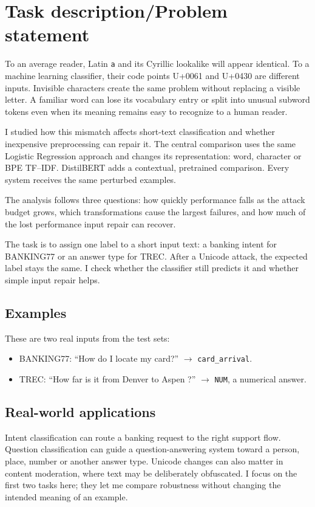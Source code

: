 \section{Task description/Problem statement}

To an average reader, Latin \texttt{a} and its Cyrillic lookalike will appear identical. To a machine learning classifier, their code points U+0061 and U+0430 are different inputs. Invisible characters create the same problem without replacing a visible letter. A familiar word can lose its vocabulary entry or split into unusual subword tokens even when its meaning remains easy to recognize to a human reader.

I studied how this mismatch affects short-text classification and whether inexpensive preprocessing can repair it. The central comparison uses the same Logistic Regression approach and changes its representation: word, character or BPE TF--IDF. DistilBERT adds a contextual, pretrained comparison. Every system receives the same perturbed examples.




The analysis follows three questions: how quickly performance falls as the attack budget grows, which transformations cause the largest failures, and how much of the lost performance input repair can recover.

The task is to assign one label to a short input text: a banking intent for BANKING77 or an answer type for TREC. After a Unicode attack, the expected label stays the same. I check whether the classifier still predicts it and whether simple input repair helps.

\subsection{Examples}
These are two real inputs from the test sets:
\begin{itemize}
\item BANKING77: ``How do I locate my card?'' $\rightarrow$ \texttt{card\_arrival}.
\item TREC: ``How far is it from Denver to Aspen ?'' $\rightarrow$ \texttt{NUM}, a numerical answer.
\end{itemize}

\subsection{Real-world applications}
Intent classification can route a banking request to the right support flow. Question classification can guide a question-answering system toward a person, place, number or another answer type. Unicode changes can also matter in content moderation, where text may be deliberately obfuscated. I focus on the first two tasks here; they let me compare robustness without changing the intended meaning of an example.
